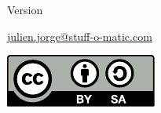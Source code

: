 \begin{titlepage}

  \pagestyle{empty}
  \centering

  \makeatletter

  \vspace*{\fill}
  \vspace{-9cm}

  {\Huge\bfseries \@title}

  \vspace{1cm}
  Version \version

  \vfill

  \begin{minipage}{0.85\textwidth}
    \vfill

    \@author

    \href{mailto:julien.jorge@stuff-o-matic.com}{julien.jorge@stuff-o-matic.com}
  \end{minipage}%
  \hfill%
  \begin{minipage}{0.15\textwidth}%
    \raggedright
    \includegraphics[width=\linewidth]{assets/by-sa.pdf}
  \end{minipage}

  \makeatother
\end{titlepage}
